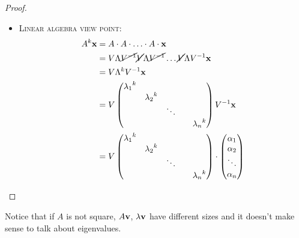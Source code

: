 \documentclass[computationalMathematics.tex]{subfiles}
\begin{document}
\begin{proof}
\begin{itemize}
  \item \textsc{Linear algebra view point:}
    \begin{equation}
      \begin{split}
        A^k {\bf x } &= A \cdot A \cdot \ldots \cdot A \cdot {\bf x }\\
        &=V \Lambda \cancel{{V}^{-1}} \cancel{V} \Lambda \cancel{{V}^{-1}} \ldots \cancel{V} \Lambda {V}^{-1} {\bf x }\\
        &= V \Lambda^k {V}^{-1} {\bf x }\\
        &=V \begin{pmatrix}
          {\lambda_1}^k\\
          & {\lambda_2}^k\\
          && \ddots\\
          &&&& {\lambda_n}^k\\
        \end{pmatrix}
        {V}^{-1} {\bf x }\\
        &=V \begin{pmatrix}
          {\lambda_1}^k\\
          & {\lambda_2}^k\\
          && \ddots\\
          &&&& {\lambda_n}^k\\
        \end{pmatrix}
        \cdot \begin{pmatrix}
          {\alpha_1}\\
          {\alpha_2}\\
          \ddots\\
          {\alpha_n}\\
        \end{pmatrix}
      \end{split}
    \end{equation}

  \end{itemize}
\end{proof}

Notice that if $A$ is not square, $A{\bf v }$, $\lambda {\bf v }$ have different sizes and it doesn't make sense to talk about eigenvalues.
\end{document}
